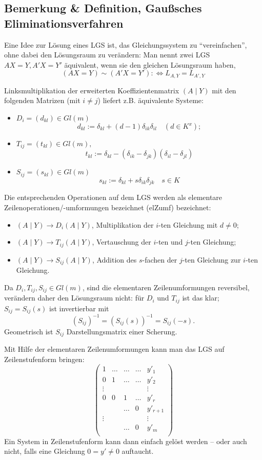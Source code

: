 \subsection{Bemerkung \& Definition, Gaußsches Eliminationsverfahren}
	\begin{Definition}
	Eine Idee zur Lösung eines LGS ist, das Gleichungssystem zu "`vereinfachen"', ohne dabei den Lösungsraum zu verändern: Man nennt zwei LGS $ AX=Y, A'X=Y' $ äquivalent, wenn sie den gleichen Lösungsraum haben,
		\[ (AX=Y)\sim (A'X=Y'):\Leftrightarrow L_{A,Y} = L_{A',Y} \]
	\end{Definition}
	Linksmultiplikation der erweiterten Koeffizientenmatrix $ (A\mid Y) $ mit den folgenden Matrizen (mit $ i\neq j $) liefert z.B. äquivalente Systeme:
	\begin{itemize}
		\item $ D_i = (d_{kl})\in Gl(m) $
			\[ d_{kl} := \delta_{kl}+(d-1)\delta_{ik}\delta_{il}\quad (d\in K^x); \]
		\item $ T_{ij} = (t_{kl})\in Gl(m), $
			\[ t_{kl} := \delta_{kl}-(\delta_{ik}-\delta_{jk})(\delta_{il}-\delta_{jl}) \]
		\item $ S_{ij}=(s_{kl})\in Gl(m) $
			\[ s_{kl} := \delta_{kl}+s\delta_{ik}\delta_{jk} \quad s\in K\]
	\end{itemize}
	Die entsprechenden Operationen auf dem LGS werden als elementare Zeilenoperationen/-umformungen bezeichnet (elZumf) bezeichnet:
	\begin{itemize}
		\item $ (A\mid Y) \to D_i (A\mid Y) $, Multiplikation der $ i $-ten Gleichung mit $ d\neq 0 $;
		\item $ (A\mid Y) \to T_{ij} (A\mid Y) $, Vertauschung der $ i $-ten und $ j $-ten Gleichung;
		\item $ (A\mid Y) \to S_{ij} (A\mid Y)$, Addition des $ s $-fachen der $ j $-ten Gleichung zur $ i $-ten Gleichung.
	\end{itemize}
	Da $ D_i,T_{ij},S_{ij}\in Gl(m) $, sind die elementaren Zeilenumformungen reversibel, verändern daher den Lösungsraum nicht: für $ D_i $ und $ T_{ij} $ ist das klar; $ S_{ij} = S_{ij}(s) $ ist invertierbar mit
		\[ (S_{ij})^{-1} = (S_{ij}(s))^{-1} = S_{ij}(-s). \]
	Geometrisch ist $ S_{ij} $ Darstellungsmatrix einer Scherung.
	
	\begin{Definition}[Zeilenstufenform]
	Mit Hilfe der elementaren Zeilenumformungen kann man das LGS auf Zeilenstufenform bringen:
		\[ \begin{pmatrix}
			1 & \dots & \dots &\dots & y'_1\\
			0 & 1 & \dots &\dots & y'_2\\
			\vdots & & & &\vdots \\
			0 & 0 & 1 &\dots & y'_r\\
			  &   & \dots  &   0 & y'_{r+1}\\
			\vdots & & & & \vdots \\
			  &   &  \dots &   0 & y'_{m}\\
		\end{pmatrix} \]
	Ein System in Zeilenstufenform kann dann einfach gelöst werden -- oder auch nicht, falls eine Gleichung $ 0 = y' \neq 0 $ auftaucht.
	\end{Definition}
